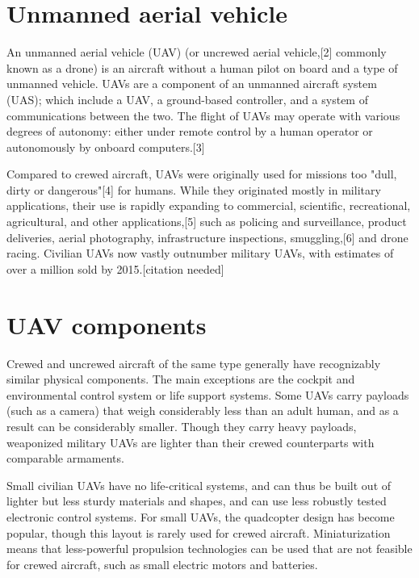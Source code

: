 \section{Unmanned aerial vehicle}
\label{sec:unmanned-aerial-vehicle}

An unmanned aerial vehicle (UAV) (or uncrewed aerial vehicle,[2] commonly known as a drone) is an aircraft without a human pilot on board and a type of unmanned vehicle. UAVs are a component of an unmanned aircraft system (UAS); which include a UAV, a ground-based controller, and a system of communications between the two. The flight of UAVs may operate with various degrees of autonomy: either under remote control by a human operator or autonomously by onboard computers.[3]

Compared to crewed aircraft, UAVs were originally used for missions too "dull, dirty or dangerous"[4] for humans. While they originated mostly in military applications, their use is rapidly expanding to commercial, scientific, recreational, agricultural, and other applications,[5] such as policing and surveillance, product deliveries, aerial photography, infrastructure inspections, smuggling,[6] and drone racing. Civilian UAVs now vastly outnumber military UAVs, with estimates of over a million sold by 2015.[citation needed]



\section{UAV components}

Crewed and uncrewed aircraft of the same type generally have recognizably similar physical components. The main exceptions are the cockpit and environmental control system or life support systems. Some UAVs carry payloads (such as a camera) that weigh considerably less than an adult human, and as a result can be considerably smaller. Though they carry heavy payloads, weaponized military UAVs are lighter than their crewed counterparts with comparable armaments.

Small civilian UAVs have no life-critical systems, and can thus be built out of lighter but less sturdy materials and shapes, and can use less robustly tested electronic control systems. For small UAVs, the quadcopter design has become popular, though this layout is rarely used for crewed aircraft. Miniaturization means that less-powerful propulsion technologies can be used that are not feasible for crewed aircraft, such as small electric motors and batteries.

